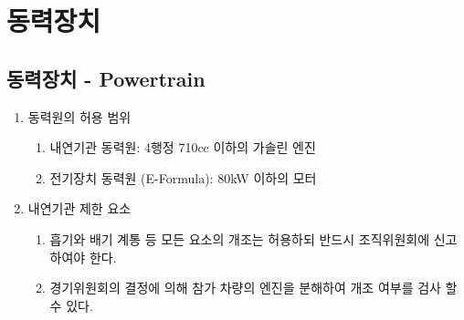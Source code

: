 \documentclass[final,a4paper,10pt]{report}
\begin{document}
\chapter{동력장치}

\section{동력장치 - Powertrain}\label{rule:formula-technical.powertrain} \label{section:동력장치}
\begin{enumerate}
  \item\label{rule:formula-technical.powertrain.permitted-power-sources} 동력원의 허용 범위
    \begin{enumerate}
      \item\label{rule:formula-technical.powertrain.permitted-power-sources.ice-4stroke-max-710cc} 내연기관 동력원: 4행정 710cc 이하의 가솔린 엔진
      \item\label{rule:formula-technical.powertrain.permitted-power-sources.e-formula-max-80kw} 전기장치 동력원 (E-Formula): 80kW 이하의 모터
    \end{enumerate}

  \item\label{rule:formula-technical.powertrain.ice-restrictions} 내연기관 제한 요소
    \begin{enumerate}
      \item\label{rule:formula-technical.powertrain.ice-restrictions.modifications-require-notice} 흡기와 배기 계통 등 모든 요소의 개조는 허용하되 반드시 조직위원회에 신고하여야 한다.
      \item\label{rule:formula-technical.powertrain.ice-restrictions.engine-teardown-inspection} 경기위원회의 결정에 의해 참가 차량의 엔진을 분해하여 개조 여부를 검사 할 수 있다.
    \end{enumerate}


\end{enumerate}
\end{document}
